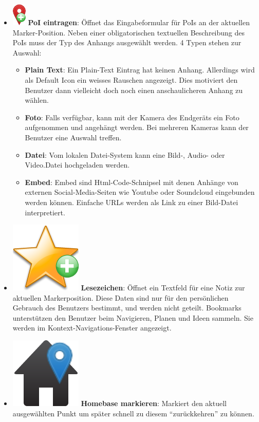 \begin{itemize}[leftmargin=*,noitemsep,topsep=1ex,parsep=0pt,partopsep=0pt]
\item \includegraphics[scale=0.55]{bilder/icons/add-marker.png} \textbf{PoI eintragen}: Öffnet das Eingabeformular für PoIs an der aktuellen Marker-Position. Neben einer obligatorischen textuellen Beschreibung des PoIs muss der Typ des Anhangs ausgewählt werden. 4 Typen stehen zur Auswahl:
	\begin{itemize}[leftmargin=*,noitemsep,topsep=1ex,parsep=0pt,partopsep=0pt]
		\item \textbf{Plain Text}: Ein Plain-Text Eintrag hat keinen Anhang. Allerdings wird als Default Icon ein weisses Rauschen angezeigt. Dies motiviert den Benutzer dann vielleicht doch noch einen anschaulicheren Anhang zu wählen.
		\item \textbf{Foto}: Falls verfügbar, kann mit der Kamera des Endgeräts ein Foto aufgenommen und angehängt werden. Bei mehreren Kameras kann der Benutzer eine Auswahl treffen.
		\item \textbf{Datei}: Vom lokalen Datei-System kann eine Bild-, Audio- oder Video.Datei hochgeladen werden.
		\item \textbf{Embed}: Embed sind Html-Code-Schnipsel mit denen Anhänge von externen Social-Media-Seiten wie Youtube oder Soundcloud eingebunden werden können. Einfache URLs werden als Link zu einer Bild-Datei interpretiert.
	\end{itemize}
\item \includegraphics[scale=0.15]{bilder/icons/add-bookmark.png} \textbf{Lesezeichen}: Öffnet ein Textfeld für eine Notiz zur aktuellen Markerposition. Diese Daten sind nur für den persönlichen Gebrauch des Benutzers bestimmt, und werden nicht geteilt. Bookmarks unterstützen den Benutzer beim Navigieren, Planen und Ideen sammeln.
Sie werden im Kontext-Navigations-Fenster angezeigt.
\item \includegraphics[scale=0.15]{bilder/icons/set-home.png} \textbf{Homebase markieren}: Markiert den aktuell ausgewählten Punkt um später schnell zu diesem "`zurückkehren"' zu können.

\end{itemize}
